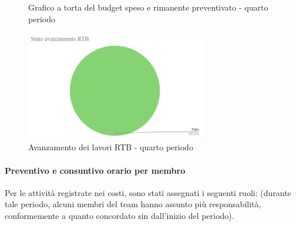 \begin{figure}[H]
    \centering
    \begin{minipage}[b]{0.45\textwidth}
        \centering
        \caption{Grafico a torta del budget speso e rimanente preventivato - quarto periodo}
        \label{fig:Budget_speso_4}
    \end{minipage}
    
    \vspace{1cm}

    \begin{minipage}[b]{0.70\textwidth}
        \centering
        \includegraphics[width=0.7\textwidth]{../Images/avanzamento4Periodo.png}
        \caption{Avanzamento dei lavori RTB - quarto periodo}
        \label{fig:Avanzamento_RTB_4}
    \end{minipage}
\end{figure}

\paragraph{Preventivo e consuntivo orario per membro} \hspace{1pt}
Per le attività registrate nei costi, sono stati assegnati i seguenti ruoli: (durante tale periodo, alcuni membri del team hanno assunto più responsabilità, conformemente a quanto concordato sin dall'inizio del periodo).

